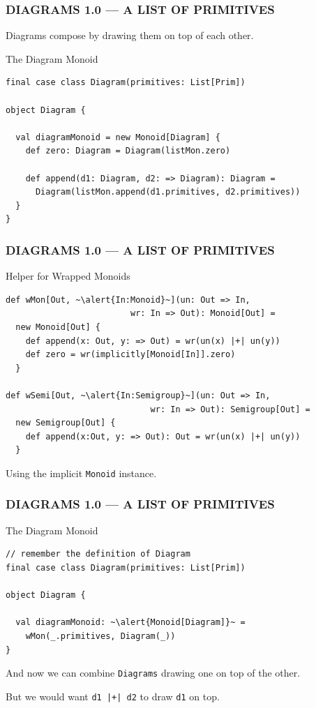 \documentclass{beamer}
\begin{document}
\begin{frame}[fragile] \frametitle{DIAGRAMS 1.0 --- A LIST OF PRIMITIVES}
Diagrams compose by drawing them on top of each other.
  \begin{block}{The Diagram Monoid}
  \begin{lstlisting}
final case class Diagram(primitives: List[Prim])

object Diagram {

  val diagramMonoid = new Monoid[Diagram] {
    def zero: Diagram = Diagram(listMon.zero)

    def append(d1: Diagram, d2: => Diagram): Diagram =
      Diagram(listMon.append(d1.primitives, d2.primitives))
  }
}
  \end{lstlisting}
  \end{block}
\end{frame}

\begin{frame}[fragile] \frametitle{DIAGRAMS 1.0 --- A LIST OF PRIMITIVES}
  \begin{block}{Helper for Wrapped Monoids}
  \begin{lstlisting}
def wMon[Out, ~\alert{In:Monoid}~](un: Out => In,
                         wr: In => Out): Monoid[Out] =
  new Monoid[Out] {
    def append(x: Out, y: => Out) = wr(un(x) |+| un(y))
    def zero = wr(implicitly[Monoid[In]].zero)
  }

def wSemi[Out, ~\alert{In:Semigroup}~](un: Out => In,
                             wr: In => Out): Semigroup[Out] =
  new Semigroup[Out] {
    def append(x:Out, y: => Out): Out = wr(un(x) |+| un(y))
  }
  \end{lstlisting}
  \end{block}
Using the implicit \texttt{Monoid} instance.
\end{frame}

\begin{frame}[fragile] \frametitle{DIAGRAMS 1.0 --- A LIST OF PRIMITIVES}
  \begin{block}{The Diagram Monoid}
  \begin{lstlisting}
// remember the definition of Diagram
final case class Diagram(primitives: List[Prim])

object Diagram {

  val diagramMonoid: ~\alert{Monoid[Diagram]}~ =
    wMon(_.primitives, Diagram(_))
}
  \end{lstlisting}
  \end{block}

  And now we can combine \texttt{Diagrams} drawing one on top of the other.

  But we would want \alert{\texttt{d1 |+| d2} to draw \texttt{d1} on top.}
\end{frame}
\end{document}
